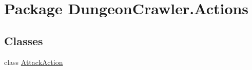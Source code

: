 \hypertarget{namespace_dungeon_crawler_1_1_actions}{}\section{Package Dungeon\+Crawler.\+Actions}
\label{namespace_dungeon_crawler_1_1_actions}
\subsection*{Classes}
\begin{DoxyCompactItemize}
\item 
class \hyperlink{class_dungeon_crawler_1_1_actions_1_1_attack_action}{Attack\+Action}
\end{DoxyCompactItemize}
